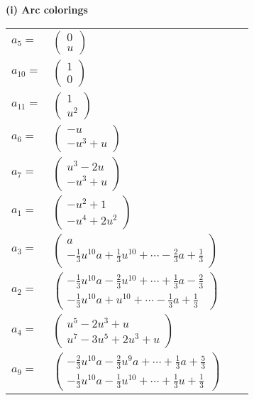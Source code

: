 \documentclass[1p]{elsarticle_modified}
\theoremstyle{definition}
\begin{document}
\flushleft \textbf{(i) Arc colorings}\\
\begin{tabular}{m{7pt} m{180pt} m{7pt} m{180pt} }
\flushright $a_{5}=$&$\begin{pmatrix}0\\u\end{pmatrix}$ \\
\flushright $a_{10}=$&$\begin{pmatrix}1\\0\end{pmatrix}$ \\
\flushright $a_{11}=$&$\begin{pmatrix}1\\u^2\end{pmatrix}$ \\
\flushright $a_{6}=$&$\begin{pmatrix}- u\\- u^3+u\end{pmatrix}$ \\
\flushright $a_{7}=$&$\begin{pmatrix}u^3-2 u\\- u^3+u\end{pmatrix}$ \\
\flushright $a_{1}=$&$\begin{pmatrix}- u^2+1\\- u^4+2 u^2\end{pmatrix}$ \\
\flushright $a_{3}=$&$\begin{pmatrix}a\\-\frac{1}{3} u^{10} a+\frac{1}{3} u^{10}+\cdots-\frac{2}{3} a+\frac{1}{3}\end{pmatrix}$ \\
\flushright $a_{2}=$&$\begin{pmatrix}-\frac{1}{3} u^{10} a-\frac{2}{3} u^{10}+\cdots+\frac{1}{3} a-\frac{2}{3}\\-\frac{1}{3} u^{10} a+u^{10}+\cdots-\frac{1}{3} a+\frac{1}{3}\end{pmatrix}$ \\
\flushright $a_{4}=$&$\begin{pmatrix}u^5-2 u^3+u\\u^7-3 u^5+2 u^3+u\end{pmatrix}$ \\
\flushright $a_{9}=$&$\begin{pmatrix}-\frac{2}{3} u^{10} a-\frac{2}{3} u^9 a+\cdots+\frac{1}{3} a+\frac{5}{3}\\-\frac{1}{3} u^{10} a-\frac{1}{3} u^{10}+\cdots+\frac{1}{3} u+\frac{1}{3}\end{pmatrix}$ \\

\end{tabular}
\end{document}
